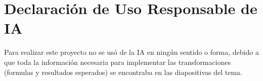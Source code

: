 \section{Declaración de Uso Responsable de IA}
    Para realizar este proyecto no se usó de la IA en ningún sentido 
    o forma, debido a que toda la información necesaria para implementar 
    las transformaciones (formulas y resultados esperados) se encontraba 
    en las diapositivas del tema.